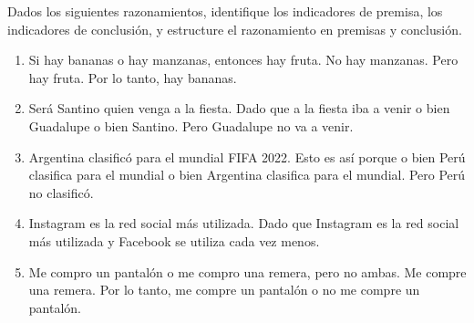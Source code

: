 \begin{exercise}
    Dados los siguientes razonamientos, identifique los indicadores de premisa,
    los indicadores de conclusión, y estructure el razonamiento en premisas y
    conclusión.

    \begin{enumerate}
        \item Si hay bananas o hay manzanas, entonces hay fruta. No hay
        manzanas. Pero hay fruta. Por lo tanto, hay bananas.

        \item Será Santino quien venga a la fiesta. Dado que a la fiesta iba a
        venir o bien Guadalupe o bien Santino. Pero Guadalupe no va a venir.

        \item Argentina clasificó para el mundial FIFA 2022. Esto es así porque
        o bien Perú clasifica para el mundial o bien Argentina clasifica para el
        mundial. Pero Perú no clasificó.

        \item Instagram es la red social más utilizada. Dado que Instagram es la
        red social más utilizada y Facebook se utiliza cada vez menos.

        \item Me compro un pantalón o me compro una remera, pero no ambas. Me
        compre una remera. Por lo tanto, me compre un pantalón o no me compre un
        pantalón.
      \end{enumerate}
    \end{exercise}

